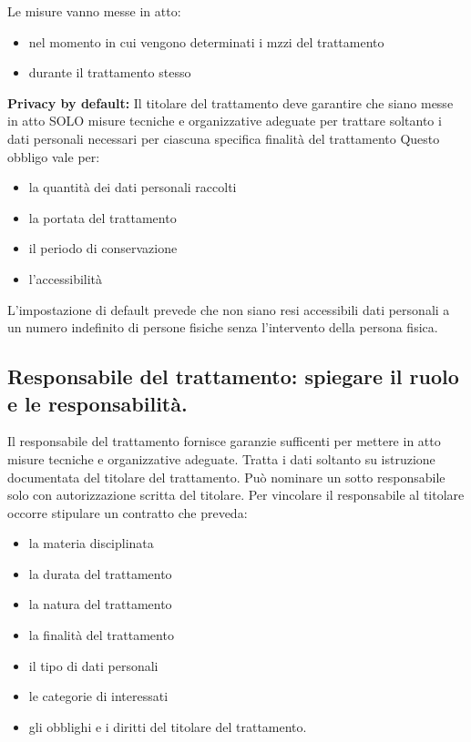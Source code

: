 Le misure vanno messe in atto:
\begin{itemize}
    \item nel momento in cui vengono determinati i mzzi del trattamento
    \item durante il trattamento stesso
\end{itemize}
\textbf{Privacy by default:}
\newline
Il titolare del trattamento deve garantire che siano messe in atto SOLO misure tecniche e organizzative adeguate per trattare soltanto i dati personali necessari per ciascuna specifica finalità del trattamento
\newline
Questo obbligo vale per:
\begin{itemize}
    \item la quantità dei dati personali raccolti
    \item la portata del trattamento
    \item il periodo di conservazione
    \item l'accessibilità
\end{itemize}
L'impostazione di default prevede che non siano resi accessibili dati personali a un numero indefinito di persone fisiche senza l'intervento della persona fisica.

\subsection{Responsabile del trattamento: spiegare il ruolo e le responsabilità.}

Il responsabile del trattamento fornisce garanzie sufficenti per mettere in atto misure tecniche e organizzative adeguate.
Tratta i dati soltanto su istruzione documentata del titolare del trattamento.
\newline
Può nominare un sotto responsabile solo con autorizzazione scritta del titolare.
\newline
Per vincolare il responsabile al titolare occorre stipulare un contratto che preveda:
\begin{itemize}
    \item la materia disciplinata
    \item la durata del trattamento
    \item la natura del trattamento
    \item la finalità del trattamento
    \item il tipo di dati personali
    \item le categorie di interessati
    \item gli obblighi e i diritti del titolare del trattamento.
\end{itemize}

